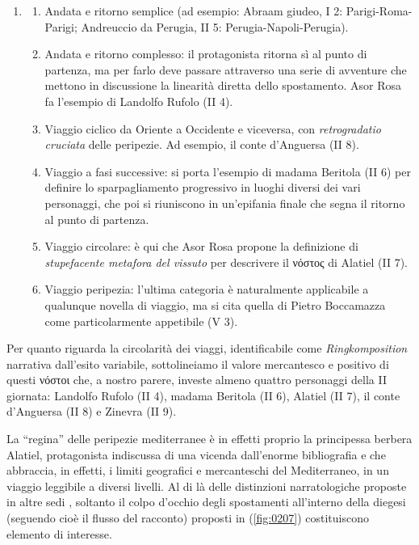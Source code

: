 \begin{enumerate}
\def\labelenumi{(\arabic{enumi})}
\item
  \begin{enumerate}
  \def\labelenumii{(\roman{enumii})}
  \tightlist
  \item
    Andata e ritorno semplice (ad esempio: Abraam giudeo, I 2:
    Parigi-Roma-Parigi; Andreuccio da Perugia, II 5:
    Perugia-Napoli-Perugia).
  \item
    Andata e ritorno complesso: il protagonista ritorna sì al punto di
    partenza, ma per farlo deve passare attraverso una serie di
    avventure che mettono in discussione la linearità diretta dello
    spostamento. Asor Rosa fa l'esempio di Landolfo Rufolo (II 4).
  \item
    Viaggio ciclico da Oriente a Occidente e viceversa, con
    \emph{retrogradatio cruciata} delle peripezie. Ad esempio, il conte
    d'Anguersa (II 8).
  \item
    Viaggio a fasi successive: si porta l'esempio di madama Beritola (II
    6) per definire lo sparpagliamento progressivo in luoghi diversi dei
    vari personaggi, che poi si riuniscono in un'epifania finale che
    segna il ritorno al punto di partenza.
  \item
    Viaggio circolare: è qui che Asor Rosa propone la definizione di
    \emph{stupefacente metafora del vissuto} per descrivere il νόστος di
    Alatiel (II 7).
  \item
    Viaggio peripezia: l'ultima categoria è naturalmente applicabile a
    qualunque novella di viaggio, ma si cita quella di Pietro Boccamazza
    come particolarmente appetibile (V 3).
  \end{enumerate}
\end{enumerate}

Per quanto riguarda la circolarità dei viaggi, identificabile come
\emph{Ringkomposition} narrativa dall'esito variabile, sottolineiamo il
valore mercantesco e positivo di questi νόστοι che, a nostro parere,
investe almeno quattro personaggi della II giornata: Landolfo Rufolo (II
4), madama Beritola (II 6), Alatiel (II 7), il conte d'Anguersa (II 8) e
Zinevra (II 9).

La ``regina'' delle peripezie mediterranee è in effetti proprio la
principessa berbera Alatiel, protagonista indiscussa di una vicenda
dall'enorme bibliografia e che abbraccia, in effetti, i limiti
geografici e mercanteschi del Mediterraneo, in un viaggio leggibile a
diversi livelli. Al di là delle distinzioni narratologiche proposte in
altre sedi \autocite{bolpagni2016}, soltanto il colpo d'occhio degli
spostamenti all'interno della diegesi (seguendo cioè il flusso del
racconto) proposti in (\ref{fig:0207}) costituiscono elemento di
interesse.

